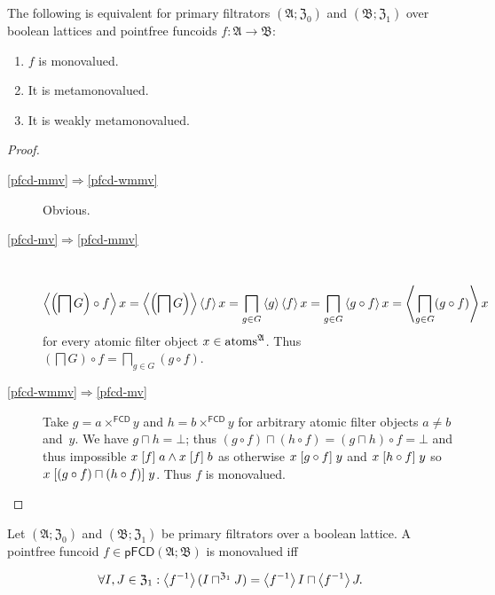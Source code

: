 \begin{thm}
The following is equivalent for primary filtrators $(\mathfrak{A};\mathfrak{Z}_{0})$
and $(\mathfrak{B};\mathfrak{Z}_{1})$ over boolean lattices and pointfree
funcoids $f:\mathfrak{A}\rightarrow\mathfrak{B}$:
\begin{enumerate}
\item \label{pfcd-mv}$f$ is monovalued.
\item \label{pfcd-mmv}It is metamonovalued.
\item \label{pfcd-wmmv}It is weakly metamonovalued.
\end{enumerate}
\end{thm}
\begin{proof}
~
\begin{description}
\item [{\ref{pfcd-mmv}$\Rightarrow$\ref{pfcd-wmmv}}] Obvious.
\item [{\ref{pfcd-mv}$\Rightarrow$\ref{pfcd-mmv}}] ~
\[
\left\langle \left(\bigsqcap G\right)\circ f\right\rangle x=\left\langle \left(\bigsqcap G\right)\right\rangle\left\langle f\right\rangle x=\bigsqcap_{g\in G}\left\langle g\right\rangle\left\langle f\right\rangle x=\bigsqcap_{g\in G}\left\langle g\circ f\right\rangle x=\left\langle \bigsqcap_{g\in G}(g\circ f)\right\rangle x
\]
for every atomic filter object $x\in\operatorname{atoms}^{\mathfrak{A}}$. Thus
$\left(\bigsqcap G\right)\circ f=\bigsqcap_{g\in G}(g\circ f)$.
\item [{\ref{pfcd-wmmv}$\Rightarrow$\ref{pfcd-mv}}] Take $g=a\times^{\mathsf{FCD}}y$
and $h=b\times^{\mathsf{FCD}}y$ for arbitrary atomic filter objects
$a\ne b$ and~$y$. We have $g\sqcap h=\bot$; thus $(g\circ f)\sqcap(h\circ f)=(g\sqcap h)\circ f=\bot$
and thus impossible $x\mathrel{\left[f\right]}a\land x\mathrel{\left[f\right]}b$ as otherwise $x\mathrel{\left[g\circ f\right]}y$
and $x\mathrel{\left[h\circ f\right]}y$ so $x\mathrel{\left[(g\circ f)\sqcap(h\circ f)\right]}y$.
Thus $f$ is monovalued.
\end{description}
\end{proof}
\begin{thm}
Let $(\mathfrak{A};\mathfrak{Z}_{0})$ and $(\mathfrak{B};\mathfrak{Z}_{1})$
be primary filtrators over a boolean lattice. A pointfree funcoid
$f\in\mathsf{pFCD}(\mathfrak{A};\mathfrak{B})$ is monovalued iff

\[
\forall I,J\in\mathfrak{Z}_{1}:\left\langle f^{-1}\right\rangle(I\sqcap^{\mathfrak{Z}_{1}}J)=\left\langle f^{-1}\right\rangle I\sqcap\left\langle f^{-1}\right\rangle J.
\]
\end{thm}

